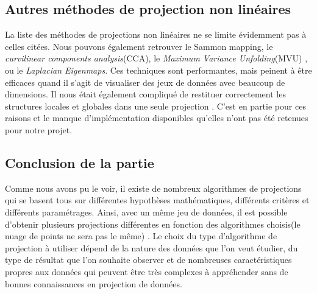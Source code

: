 \subsection{Autres méthodes de projection non linéaires}
La liste des méthodes de projections non linéaires ne se limite évidemment pas à celles citées.
Nous pouvons également retrouver le Sammon mapping\cite{sammon1969nonlinear}, le \textit{curvilinear components analysis}(CCA)\cite{demartines1997curvilinearCCA}, le \textit{Maximum Variance Unfolding}(MVU)\cite{weinberger2006MVU1} \cite{song2007MVU2}, 
ou le \textit{Laplacian Eigenmaps}\cite{saul2000introduction}. 
Ces techniques sont performantes, mais peinent à être efficaces quand il s’agit de visualiser des jeux de données avec beaucoup de dimensions. Il nous était également compliqué de restituer correctement les structures locales et globales dans une seule projection\cite{belkin2002semi} \cite{van2008TSNE}.
C’est en partie pour ces raisons et le manque d'implémentation disponibles qu'elles n’ont pas été retenues pour notre projet.
\smallskip


\subsection{Conclusion de la partie}
Comme nous avons pu le voir, il existe de nombreux algorithmes de projections qui se basent tous sur différentes hypothèses mathématiques, différents critères et différents paramétrages. Ainsi, avec un même jeu de données, il est possible d'obtenir plusieurs projections différentes en fonction des algorithmes choisis(le nuage de points ne sera pas le même) . 
Le choix du type d’algorithme de projection à utiliser dépend de la nature des données que l’on veut étudier, du type de résultat que l’on souhaite observer et de nombreuses caractéristiques propres aux données qui peuvent être très complexes à appréhender sans de bonnes connaissances en projection de données.

